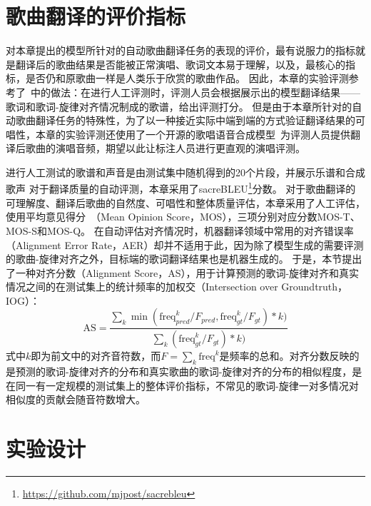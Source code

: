 \section{歌曲翻译的评价指标}
\label{sec:metric}
对本章提出的模型所针对的自动歌曲翻译任务的表现的评价，最有说服力的指标就是翻译后的歌曲结果是否能被正常演唱、歌词文本易于理解，以及，最核心的指标，是否仍和原歌曲一样是人类乐于欣赏的歌曲作品。
因此，本章的实验评测参考了\citet{songmass}~中的做法：在进行人工评测时，评测人员会根据展示出的模型翻译结果——歌词和歌词-旋律对齐情况制成的歌谱，给出评测打分。
但是由于本章所针对的自动歌曲翻译任务的特殊性，为了以一种接近实际中端到端的方式验证翻译结果的可唱性，本章的实验评测还使用了一个开源的歌唱语音合成模型~\citep{diffsinger}为评测人员提供翻译后歌曲的演唱音频，期望以此让标注人员进行更直观的演唱评测。

进行人工测试的歌谱和声音是由测试集中随机得到的20个片段，并展示乐谱和合成歌声
对于翻译质量的自动评测，本章采用了sacreBLEU\footnote{\url{https://github.com/mjpost/sacrebleu}}分数。
对于歌曲翻译的可理解度、翻译后歌曲的自然度、可唱性和整体质量评估，本章采用了人工评估，使用平均意见得分~（Mean Opinion Score，MOS），三项分别对应分数MOS-T、MOS-S和MOS-Q。
在自动评估对齐情况时，机器翻译领域中常用的对齐错误率（Alignment Error Rate，AER）却并不适用于此，因为除了模型生成的需要评测的歌曲-旋律对齐之外，目标端的歌词翻译结果也是机器生成的。
于是，本节提出了一种对齐分数（Alignment Score，AS），用于计算预测的歌词-旋律对齐和真实情况之间的在测试集上的统计频率的加权交（Intersection over Groundtruth，IOG）：
\begin{equation}
    \text{AS} = \frac{\sum_{k}\min(\text{freq}_{pred}^k/F_{pred}, \text{freq}_{gt}^k/F_{gt}) * k)}{\sum_{k} (\text{freq}_{gt}^k/F_{gt}) * k) }
\end{equation}
式中$k$即为前文中的对齐音符数，而$F = \sum_{k} \text{freq}^k$是频率的总和。对齐分数反映的是预测的歌词-旋律对齐的分布和真实歌曲的歌词-旋律对齐的分布的相似程度，是在同一有一定规模的测试集上的整体评价指标，不常见的歌词-旋律一对多情况对相似度的贡献会随音符数增大。
\section{实验设计}
